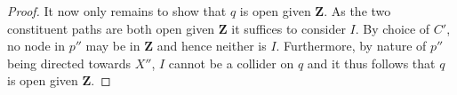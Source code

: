 \documentclass[11pt,a4paper]{article}
\newtheorem{Lemma}[Satz]{Lemma}
\theoremstyle{definition}
\theoremstyle{remark}
\DeclareMathOperator{\de}{de}
\newcommand{\g}[1][G]{\mathcal{#1}}
\begin{document}
\begin{proof}
	It now only remains to show that $q$ is open given $\mathbf{Z}$. As the two constituent paths are both open given $\mathbf{Z}$ it suffices to consider $I$. By choice of $C'$, no node in $p''$ may be in $\mathbf{Z}$ and hence neither is $I$. Furthermore, by nature of $p''$ being directed towards $X''$, $I$ cannot be a collider on $q$ and it thus follows that $q$ is open given $\mathbf{Z}$.  
\end{proof}




%
%
\end{document}
